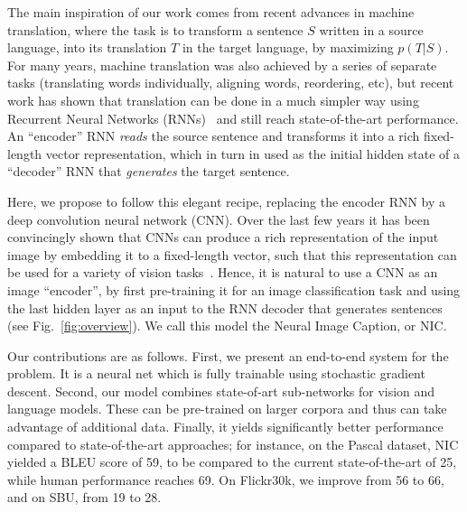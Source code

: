 The main inspiration of our work comes from recent advances in machine translation, where the task is to transform a sentence $S$ written
in a source language, into its translation $T$ in the target language, by
maximizing $p(T|S)$. For many
years, machine translation was also achieved by a series of separate tasks
(translating words individually, aligning words, reordering, etc), but recent
work has shown that translation can be done in a much simpler way using 
Recurrent Neural Networks
(RNNs)~\cite{cho2014learning,bahdanau2014neural,sutskever2014sequence}
and still reach state-of-the-art performance.
An ``encoder'' RNN {\em reads} the source sentence and
transforms it into a rich fixed-length vector representation, which in turn in used as the 
initial hidden state of a ``decoder'' RNN that {\em generates}
the target sentence.

Here, we propose to follow this elegant recipe,
replacing the encoder RNN by a deep convolution neural network (CNN). Over the last few years it has been convincingly 
shown that CNNs can produce a rich representation of the input image by embedding it
to a fixed-length vector, such that this representation can be used for a variety of
vision tasks~\cite{sermanet2013overfeat}. Hence, it is natural to use a CNN as an
image ``encoder'', by first pre-training it for an image classification task and
using the last hidden layer as an input to the RNN decoder that generates sentences (see Fig.~\ref{fig:overview}).
We call this model the Neural Image Caption, or NIC.

Our contributions are as follows. First, we present an end-to-end system for the
problem. It is a neural net which is fully trainable using stochastic
gradient descent.
Second, our model combines state-of-art sub-networks for vision and language models. These
can be pre-trained on larger corpora and thus can take advantage of additional data. Finally,  
it yields significantly better performance compared to state-of-the-art approaches;
for instance, on the Pascal dataset, NIC yielded a BLEU score of 59,
to be compared to the current state-of-the-art of 25, while human performance
reaches 69. On Flickr30k, we improve from 56 to 66, and on SBU,
from 19 to 28.
